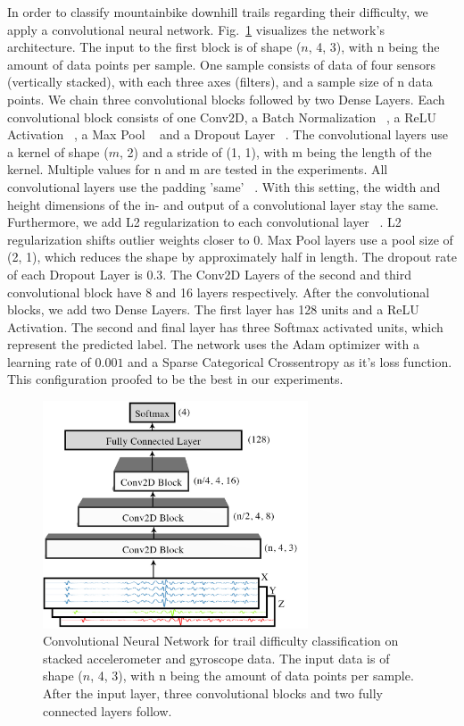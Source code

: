 \documentclass[runningheads]{llncs}
\begin{document}
In order to classify mountainbike downhill trails regarding their difficulty, we apply a convolutional neural network.
Fig.~\ref{fig3} visualizes the network's architecture.
The input to the first block is of shape ($n$, 4, 3), with n being the amount of data points per sample. 
One sample consists of data of four sensors (vertically stacked), with each three axes (filters), and a sample size of n data points.
We chain three convolutional blocks followed by two Dense Layers.
Each convolutional block consists of one Conv2D, a Batch Normalization ~\cite{ioffe2015batch}, a ReLU Activation ~\cite{hahnloser2000digital}, a Max Pool ~\cite{matsugu2003subject} and a Dropout Layer ~\cite{srivastava2014dropout}.
The convolutional layers use a kernel of shape ($m$, 2) and a stride of (1, 1), with m being the length of the kernel.
Multiple values for n and m are tested in the experiments.
All convolutional layers use the padding 'same' ~\cite{keraspaddingsame}.
With this setting, the width and height dimensions of the in- and output of a convolutional layer stay the same.
Furthermore, we add L2 regularization to each convolutional layer ~\cite{ng2004feature}.
L2 regularization shifts outlier weights closer to 0.
Max Pool layers use a pool size of (2, 1), which reduces the shape by approximately half in length.
The dropout rate of each Dropout Layer is 0.3.
The Conv2D Layers of the second and third convolutional block have 8 and 16 layers respectively.
After the convolutional blocks, we add two Dense Layers. 
The first layer has 128 units and a ReLU Activation.
The second and final layer has three Softmax activated units, which represent the predicted label.
The network uses the Adam optimizer with a learning rate of $0.001$ and a Sparse Categorical Crossentropy as it's loss function.
This configuration proofed to be the best in our experiments.

\begin{figure}
\centering 
\includegraphics[width=0.70\textwidth]{network.jpg}
\caption{Convolutional Neural Network for trail difficulty classification on stacked accelerometer and gyroscope data. 
The input data is of shape ($n$, 4, 3), with n being the amount of data points per sample. 
After the input layer, three convolutional blocks and two fully connected layers follow.}
\label{fig3}	
\end{figure}
\end{document}

